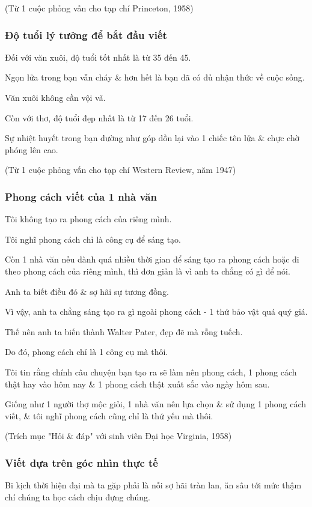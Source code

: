\documentclass{article}
\begin{document}
(Từ 1 cuộc phỏng vấn cho tạp chí Princeton, 1958)

\subsubsection{Độ tuổi lý tưởng để bắt đầu viết}
Đối với văn xuôi, độ tuổi tốt nhất là từ 35 đến 45.

Ngọn lửa trong bạn vẫn cháy \& hơn hết là bạn đã có đủ nhận thức về cuộc sống.

Văn xuôi không cần vội vã.

Còn với thơ, độ tuổi đẹp nhất là từ 17 đến 26 tuổi.

Sự nhiệt huyết trong bạn dường như góp dồn lại vào 1 chiếc tên lửa \& chực chờ phóng lên cao.

(Từ 1 cuộc phỏng vấn cho tạp chí Western Review, năm 1947)

\subsubsection{Phong cách viết của 1 nhà văn}
Tôi không tạo ra phong cách của riêng mình.

Tôi nghĩ phong cách chỉ là công cụ để sáng tạo.

Còn 1 nhà văn nếu dành quá nhiều thời gian để sáng tạo ra phong cách hoặc đi theo phong cách của riêng mình, thì đơn giản là vì anh ta chẳng có gì để nói.

Anh ta biết điều đó \& sợ hãi sự tương đồng.

Vì vậy, anh ta chẳng sáng tạo ra gì ngoài phong cách - 1 thứ bảo vật quá quý giá.

Thế nên anh ta biến thành Walter Pater, đẹp đẽ mà rỗng tuếch.

Do đó, phong cách chỉ là 1 công cụ mà thôi.

Tôi tin rằng chính câu chuyện bạn tạo ra sẽ làm nên phong cách, 1 phong cách thật hay vào hôm nay \& 1 phong cách thật xuất sắc vào ngày hôm sau.

Giống như 1 người thợ mộc giỏi, 1 nhà văn nên lựa chọn \& sử dụng 1 phong cách viết, \& tôi nghĩ phong cách cũng chỉ là thứ yếu mà thôi.

(Trích mục "Hỏi \& đáp" với sinh viên Đại học Virginia, 1958)

\subsubsection{Viết dựa trên góc nhìn thực tế}

Bi kịch thời hiện đại mà ta gặp phải là nỗi sợ hãi tràn lan, ăn sâu tới mức thậm chí chúng ta học cách chịu đựng chúng.
\end{document}
